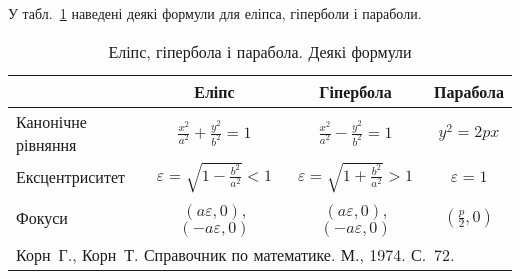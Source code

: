 \documentclass{article}\usepackage[]{graphicx}\usepackage[]{color}
\begin{document}
У табл.~\ref{tab:ellipse.hyperbola.parabola} наведені деякі
формули для еліпса, гіперболи і параболи.

\begin{table}[htbp]
\caption{Еліпс, гіпербола і парабола. Деякі формули}
\label{tab:ellipse.hyperbola.parabola}
\begin{tabularx}{\textwidth}{|X|c|c|c|}
\hline
                   & Еліпс                                    & Гіпербола                                & Парабола          \\
\hline
Канонічне рівняння & $\frac{x^2}{a^2}+\frac{y^2}{b^2}=1$      & $\frac{x^2}{a^2}-\frac{y^2}{b^2}=1$      & $y^2=2px$         \\
Ексцентриситет     & $\varepsilon=\sqrt{1-\frac{b^2}{a^2}}<1$ & $\varepsilon=\sqrt{1+\frac{b^2}{a^2}}>1$ & $\varepsilon=1$   \\
Фокуси             & $(a\varepsilon,0)$, $(-a\varepsilon,0)$  & $(a\varepsilon,0)$, $(-a\varepsilon,0)$  & $(\frac{p}{2},0)$ \\
\hline
\multicolumn{4}{|l|}{Корн~Г., Корн~Т. Справочник по математике. М., 1974. С.~72.} \\
\hline
\end{tabularx}
\end{table}
\end{document}
